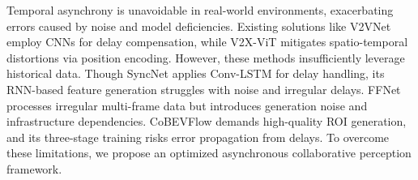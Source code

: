 
Temporal asynchrony is unavoidable in real-world environments, exacerbating errors caused by noise and model deficiencies. Existing solutions like V2VNet \cite{cp:v2vnet} employ CNNs for delay compensation, while V2X-ViT \cite{cp:v2xvit} mitigates spatio-temporal distortions via position encoding. However, these methods insufficiently leverage historical data. Though SyncNet \cite{cp:SyncNet} applies Conv-LSTM \cite{common:conv-lstm} for delay handling, its RNN-based feature generation struggles with noise and irregular delays. FFNet \cite{cp:FFNet} processes irregular multi-frame data but introduces generation noise and infrastructure dependencies. CoBEVFlow \cite{cp:cobevflow} demands high-quality ROI generation, and its three-stage training risks error propagation from delays. To overcome these limitations, we propose an optimized asynchronous collaborative perception framework.



